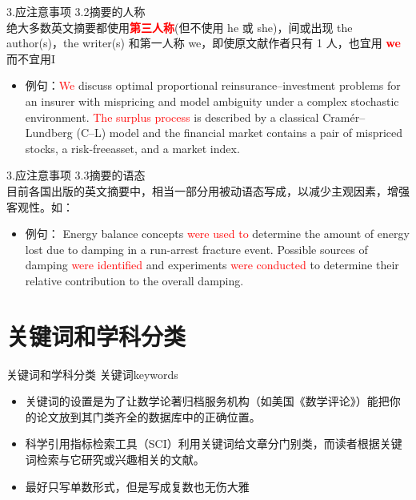 \documentclass[13pt]{ctexbeamer}
\newcommand{\red}[1]{\textcolor{red}{#1}}
\begin{document}
\begin{frame}{3.应注意事项}
    3.2摘要的人称\\

    \renewcommand{\baselinestretch}{1.3}
    绝大多数英文摘要都使用\red{\textbf{第三人称}}(但不使用 he 或 she)，间或出现 the author(s)，the writer(s) 和第一人称 we，即使原文献作者只有 1 人，也宜用 \red{\textbf{we}} 而不宜用I\vspace{0.8em}

    \begin{itemize}
        \item
        例句：\red{We} discuss optimal proportional reinsurance–investment problems for an insurer with mispricing and model ambiguity under a complex stochastic environment. \red{ The surplus process }is described by a classical Cramér--Lundberg (C--L) model and the financial market contains a pair of mispriced stocks, a risk-freeasset, and a market index.


    \end{itemize}

    \vspace{15pt}

\end{frame}
\begin{frame}{3.应注意事项}
    3.3摘要的语态\\

    \renewcommand{\baselinestretch}{1.3}
    目前各国出版的英文摘要中，相当一部分用被动语态写成，以减少主观因素，增强客观性。如：
    \vspace{0.8em}
    \begin{itemize}
        \item
        例句：	Energy balance concepts \red{were used to} determine the amount of energy
        lost due to damping in a run-arrest fracture event. Possible sources
        of damping \red{were identified }and experiments \red{were conducted} to
        determine their relative contribution to the overall damping.


    \end{itemize}



\end{frame}


\section{关键词和学科分类}
\begin{frame}{关键词和学科分类}
	关键词keywords
	\begin{itemize}

		\item 关键词的设置是为了让数学论著归档服务机构（如美国《数学评论》）能把你的论文放到其门类齐全的数据库中的正确位置。

		\item 科学引用指标检索工具（SCI）利用关键词给文章分门别类，而读者根据关键词检索与它研究或兴趣相关的文献。
		\item 最好只写单数形式，但是写成复数也无伤大雅
	\end{itemize}
\end{frame}
\end{document}
